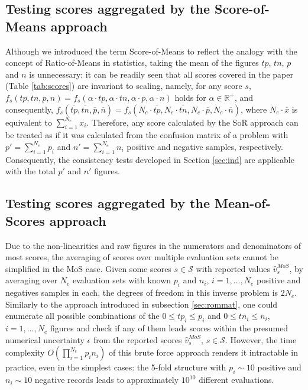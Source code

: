 \documentclass[5p, final]{elsarticle}
\begin{document}
\subsection{Testing scores aggregated by the Score-of-Means approach}
\label{sec:rom}

Although we introduced the term Score-of-Means to reflect the analogy with the concept of Ratio-of-Means in statistics, taking the mean of the figures $tp$, $tn$, $p$ and $n$ is unnecessary: it can be readily seen that all scores covered in the paper (Table \ref{tab:scores}) are invariant to scaling, namely, for any score $s$, $f_s(tp, tn, p, n) = f_s(\alpha\cdot tp, \alpha\cdot tn, \alpha\cdot p, \alpha\cdot n)$ holds for $\alpha \in\mathbb{R}^{+}$, and consequently, $f_s(\overline{tp}, \overline{tn}, \overline{p}, \overline{n}) = f_s(N_e\cdot\overline{tp}, N_e\cdot\overline{tn}, N_e\cdot\overline{p}, N_e\cdot\overline{n})$, where $N_e\cdot\overline{x}$ is equivalent to $\sum\limits_{i=1}^{N_e} x_i$. Therefore, any score calculated by the SoR approach can be treated as if it was calculated from the confusion matrix of a problem with $p'=\sum\limits_{i=1}^{N_e} p_i$ and $n'=\sum\limits_{i=1}^{N_e} n_i$ positive and negative samples, respectively. Consequently, the consistency tests developed in Section \ref{sec:ind} are applicable with the total $p'$ and $n'$ figures.

\subsection{Testing scores aggregated by the Mean-of-Scores approach}
\label{sec:mor}

Due to the non-linearities and raw figures in the numerators and denominators of most scores, the averaging of scores over multiple evaluation sets cannot be simplified in the MoS case. Given some scores $s\in\mathcal{S}$ with reported values $\hat{v}_{s}^{MoS}$, by averaging over $N_e$ evaluation sets with known $p_i$ and $n_i$, $i=1, \dots, N_e$ positive and negatives samples in each, the degrees of freedom in this inverse problem is $2N_e$. Similarly to the approach introduced in subsection \ref{sec:rommat}, one could enumerate all possible combinations of the $0 \leq tp_i\leq p_i$ and $0\leq tn_i\leq n_i$, $i=1, \dots, N_e$ figures and check if any of them leads scores within the presumed numerical uncertainty $\epsilon$ from the reported scores $\hat{v}_s^{MoS}$, $s\in\mathcal{S}$. However, the time complexity $O\left(\prod_{i=1}^{N_e}p_in_i\right)$ of this brute force approach renders it intractable in practice, even in the simplest cases: the 5-fold structure with $p_i\sim 10$ positive and $n_i\sim 10$ negative records leads to approximately $10^10$ different evaluations. 
\end{document}
